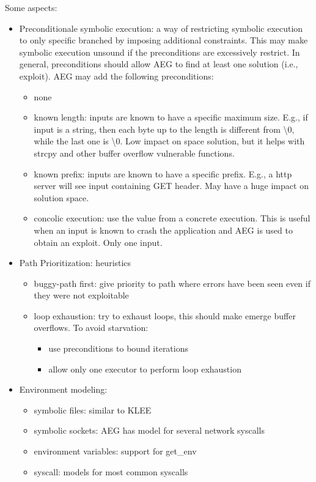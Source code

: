 \documentclass[10pt, a4paper]{article}
\begin{document}
Some aspects:
\begin{itemize}
  \item Preconditionale symbolic execution: a way of restricting symbolic execution to only specific branched by imposing additional constraints. This may make symbolic execution unsound if the preconditions are excessively restrict. In general, preconditions should allow AEG to find at least one solution (i.e., exploit). AEG may add the following preconditions:
  \begin{itemize}
    \item none
    \item known length: inputs are known to have a specific maximum size. E.g., if input is a string, then each byte up to the length is different from \textbackslash0, while the last one is \textbackslash0. Low impact on space solution, but it helps with strcpy and other buffer overflow vulnerable functions.
    \item known prefix: inputs are known to have a specific prefix. E.g., a http server will see input containing GET header. May have a huge impact on solution space.
    \item concolic execution: use the value from a concrete execution. This is useful when an input is known to crash the application and AEG is used to obtain an exploit. Only one input.
  \end{itemize}
  \item Path Prioritization: heuristics
    \begin{itemize}
      \item buggy-path first: give priority to path where errors have been seen even if they were not exploitable
      \item loop exhaustion: try to exhaust loops, this should make emerge buffer overflows. To avoid starvation:
        \begin{itemize}
          \item use preconditions to bound iterations
          \item allow only one executor to perform loop exhaustion
        \end{itemize}
    \end{itemize}
  \item Environment modeling:
  \begin{itemize}
    \item symbolic files: similar to KLEE
    \item symbolic sockets: AEG has model for several network syscalls
    \item environment variables: support for get\_env
    \item syscall: models for most common syscalls
  \end{itemize}
\end{itemize}
\end{document}
